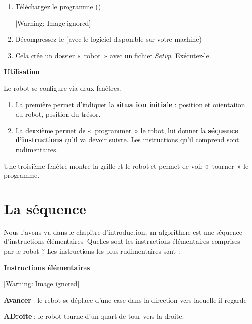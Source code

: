 \liststyleNumberingi
\begin{enumerate}
\item {
Téléchargez le programme
()}
\begin{center}
 [Warning: Image ignored] %

\end{center}
\item {
Décompressez-le (avec le logiciel disponible sur votre machine)}
\item {
Cela crée un dossier «~robot~» avec un fichier \textit{Setup}.
Exécutez-le.}
\end{enumerate}
{\sffamily\bfseries\upshape
Utilisation}

{
Le robot se configure via deux fenêtres.}

\liststyleNumberingi
\begin{enumerate}
\item {
La première permet d'indiquer la \textbf{situation
initiale} : position et orientation du robot, position du trésor.}
\item {
La deuxième permet de «~programmer~» le robot, lui donner la
\textbf{séquence d'instructions}
qu'il va devoir suivre. Les instructions
qu'il comprend sont rudimentaires. }
\end{enumerate}
{
Une troisième fenêtre montre la grille et le robot et permet de voir
«~tourner~» le programme.}

\section{La séquence}
{
Nous l'avons vu dans le chapitre
d'introduction, un algorithme est une séquence
d'instructions élémentaires. Quelles sont les
instructions élémentaires comprises par le robot ? Les instructions les
plus rudimentaires sont :}

{\bfseries
Instructions élémentaires}

\begin{center}
 [Warning: Image ignored] %

\end{center}
{\sffamily
\textbf{Avancer} : le robot se déplace d'une case dans
la direction vers laquelle il regarde}

{\sffamily
\textbf{ADroite} : le robot tourne d'un quart de tour
vers la droite. }

